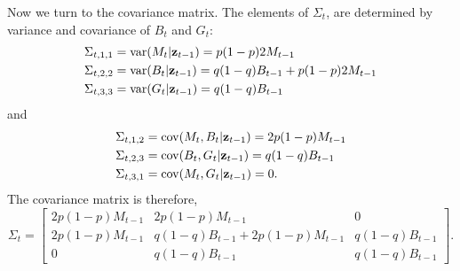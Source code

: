 \documentclass{article}
\newcommand{\bz}{{\bf z}}
\begin{document}
Now we turn to the covariance matrix. The elements of $\Sigma_t$, are determined by variance and covariance of $B_t$ and $G_t$: 
\begin{align}
\begin{split}
\Sigma_{t,1,1} &= {\rm var}(M_t|\bz_{t-1}) =p(1-p)2M_{t-1}\\
\Sigma_{t,2,2} &= {\rm var}(B_t|\bz_{t-1}) = q(1-q)B_{t-1}+p(1-p)2M_{t-1}\\
\Sigma_{t,3,3} &= {\rm var}(G_t|\bz_{t-1}) = q(1-q)B_{t-1}
\end{split}
\end{align}
and 
\begin{align}
\begin{split}
\Sigma_{t,1,2} &={\rm cov}(M_t,B_t|\bz_{t-1}) = 2p(1-p)M_{t-1}\\
\Sigma_{t,2,3} &={\rm cov}(B_t,G_t|\bz_{t-1}) = q(1-q)B_{t-1}\\
\Sigma_{t,3,1} &={\rm cov}(M_t,G_t|\bz_{t-1}) = 0.
\end{split}
\end{align}
The covariance matrix is therefore, 
\begin{equation}
\Sigma_{t} =\left[ \begin{array}{ccc}
2p(1-p)M_{t-1}  & 2p(1-p)M_{t-1}  & 0\\
2p(1-p)M_{t-1}  & q(1-q)B_{t-1} + 2p(1-p)M_{t-1}  & q(1-q)B_{t-1} \\
0 &q(1-q)B_{t-1} & q(1-q)B_{t-1}
\end{array}\right].
\end{equation}
\end{document}
